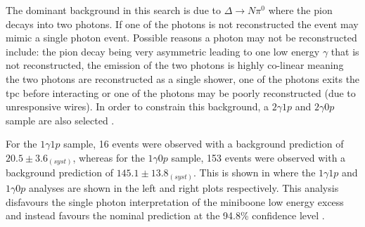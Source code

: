 The dominant background in this search is due to $\Delta \rightarrow N \pi^0$ where the pion decays into two photons. If one of the photons is not reconstructed the event may mimic a single photon event. Possible reasons a photon may not be reconstructed include: the pion decay being very asymmetric leading to one low energy $\gamma$ that is not reconstructed, the emission of the two photons is highly co-linear meaning the two photons are reconstructed as a single shower, one of the photons exits the \gls{tpc} before interacting or one of the photons may be poorly reconstructed (due to unresponsive wires). In order to constrain this background, a $2\gamma1p$ and $2\gamma0p$ sample are also selected \cite{Search_for_Neutrino_Induced_Neutral_Current_Delta_Radiative_Decay_in_MicroBooNE_and_a_First_Test_of_the_MiniBooNE_Low_Energy_Excess_under_a_Single_Photon_Hypothesis}. 

For the $1\gamma1p$ sample, 16 events were observed with a background prediction of $20.5 \pm 3.6_{(syst)}$, whereas for the $1\gamma0p$ sample, 153 events were observed with a background prediction of $145.1 \pm 13.8_{(syst)}$. This is shown in  where the $1\gamma1p$ and $1\gamma0p$ analyses are shown in the left and right plots respectively. This analysis disfavours the single photon interpretation of the \gls{miniboone} low energy excess and instead favours the nominal prediction at the 94.8\% confidence level \cite{Search_for_Neutrino_Induced_Neutral_Current_Delta_Radiative_Decay_in_MicroBooNE_and_a_First_Test_of_the_MiniBooNE_Low_Energy_Excess_under_a_Single_Photon_Hypothesis}. 

